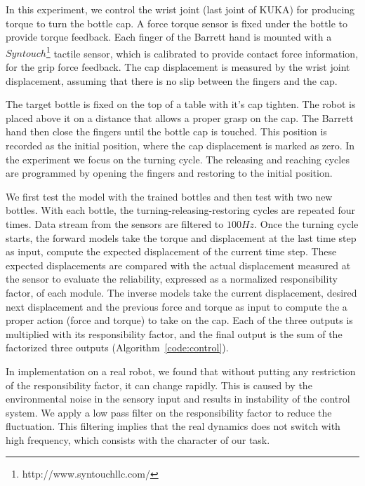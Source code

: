 In this experiment, we control the wrist joint (last joint of KUKA) for producing torque to turn the bottle cap. A force torque sensor is fixed under the bottle to provide torque feedback. Each finger of the Barrett hand is mounted with a $Syntouch$\footnote{http://www.syntouchllc.com/} tactile sensor, which is calibrated to provide contact force information, for the grip force feedback. The cap displacement is measured by the wrist joint displacement, assuming that there is no slip between the fingers and the cap.

The target bottle is fixed on the top of a table with it's cap tighten. The robot is placed above it on a distance that allows a proper grasp on the cap. The Barrett hand then close the fingers until the bottle cap is touched. This position is recorded as the initial position, where the cap displacement is marked as zero. In the experiment we focus on the turning cycle. The releasing and reaching cycles are programmed by opening the fingers and restoring to the initial position.

We first test the model with the trained bottles and then test with two new bottles. With each bottle, the turning-releasing-restoring cycles are repeated four times. Data stream from the sensors are filtered to $100Hz$. Once the turning cycle starts, the forward models take the torque and displacement at the last time step as input, compute the expected displacement of the current time step. These expected displacements are compared with the actual displacement measured at the sensor to evaluate the reliability, expressed as a normalized responsibility factor, of each module. The inverse models take the current displacement, desired next displacement and the previous force and torque as input to compute the a proper action (force and torque) to take on the cap. Each of the three outputs is multiplied with its responsibility factor, and the final output is the sum of the factorized three outputs (Algorithm~\ref{code:control}).

In implementation on a real robot, we found that without putting any restriction of the responsibility factor, it can change rapidly. This is caused by the environmental noise in the sensory input and results in instability of the control system. We apply a low pass filter on the responsibility factor to reduce the fluctuation. This filtering implies that the real dynamics does not switch with high frequency, which consists with the character of our task. %


